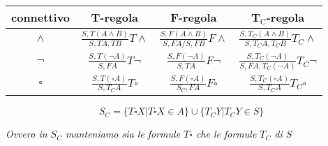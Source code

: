 \documentclass[a4paper,12pt, oneside]{book}
\begin{document}
\begin{table}[H]
  \Large
  \centering
  \begin{tabular}{c||c|c|c}
    connettivo& T-regola& F-regola&T$_{\mbox{C}}$-regola\\
    \hline
    \hline
    $\land$ & $\frac{S,T(A\land B)}{S,TA,TB}T\land$&
              $\frac{S,F(A\land B)}{S,FA/S,FB}F\land$&
              $\frac{S,T_C(A\land B)}{S,T_CA,T_CB}T_C\land$\\
    \hline
    $\neg$ & $\frac{S,T(\neg A)}{S,FA}T\neg$&
             $\frac{S,F(\neg A)}{S,TA}F\neg$&
             $\frac{S,T_C(\neg A)}{S,FA,T_C(\neg A)}T_C\neg$\\
    \hline
    $\square$ & $\frac{S,T(\square A)}{S,T_CA}T\square$&
                $\frac{S,F(\square A)}{S_C,FA}F\square$&
                $\frac{S,T_C(\square A)}{S,T_CA}T_C\square$\\
  \end{tabular}
\end{table}
\[S_C=\{T\square X|T\square X\in A\}\cup\{T_CY|T_CY\in S\}\]
\begin{center}
  \textit{Ovvero in $S_C$ manteniamo sia le formule $T\square$ che le formule
    $T_C$ di $S$}
\end{center}
\end{document}
